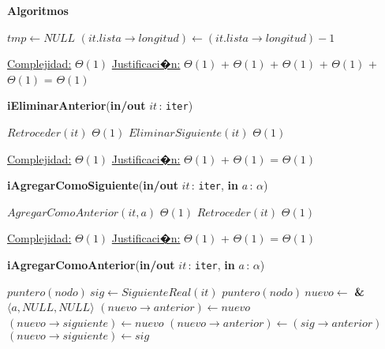 \documentclass[a4paper,10pt]{article}
\let\TipoVariable=\texttt
\let\ModificadorArgumento=\textbf
\newcommand{\In}[2]{\ModificadorArgumento{in} \ensuremath{#1}\,: \TipoVariable{#2}\xspace}
\newcommand{\Inout}[2]{\ModificadorArgumento{in/out} \ensuremath{#1}\,: \TipoVariable{#2}\xspace}
\newenvironment{Algoritmos}{%
  \vspace*{2ex}%
  \noindent\textbf{\Large Algoritmos}%
  \vspace*{2ex}%
}{}
\begin{document}
\begin{Algoritmos}
\begin{algorithm}[H]
\begin{algorithmic}[1]
			\State $tmp \gets NULL$	 
			\State $(it.lista\rightarrow longitud) \gets (it.lista\rightarrow longitud) - 1$

			\medskip
			\Statex \underline{Complejidad:} $\Theta(1)$
			\Statex \underline{Justificaci�n:} $\Theta(1)$ + $\Theta(1)$ + $\Theta(1)$ + $\Theta(1)$ + $\Theta(1)$ =  $\Theta(1)$
    	\end{algorithmic}
\end{algorithm}

	
\begin{algorithm}[H]
	\begin{algorithmic}[1]
		\State \textbf{iEliminarAnterior}(\Inout{it}{iter})
		
			\State $Retroceder(it)$	\Comment $\Theta(1)$
			\State $EliminarSiguiente(it)$	\Comment $\Theta(1)$

			\medskip
			\Statex \underline{Complejidad:} $\Theta(1)$
			\Statex \underline{Justificaci�n:} $\Theta(1)$ + $\Theta(1)$ = $\Theta(1)$
    	\end{algorithmic}
\end{algorithm}


\begin{algorithm}[H]
	\begin{algorithmic}[1]
		\State \textbf{iAgregarComoSiguiente}(\Inout{it}{iter}, \In{a}{$\alpha$})
		
			\State $AgregarComoAnterior(it, a)$		\Comment $\Theta(1)$
			\State $Retroceder(it)$	\Comment $\Theta(1)$

			\medskip
			\Statex \underline{Complejidad:} $\Theta(1)$
			\Statex \underline{Justificaci�n:} $\Theta(1)$ + $\Theta(1)$ = $\Theta(1)$
    	\end{algorithmic}
\end{algorithm}
	

\begin{algorithm}[H]
	\begin{algorithmic}[1]
		\State \textbf{iAgregarComoAnterior}(\Inout{it}{iter}, \In{a}{$\alpha$})
		
			\State $puntero(nodo) \ sig \gets SiguienteReal(it)$
			\State $puntero(nodo) \ nuevo \gets $ \textbf{\&} $\langle a, NULL, NULL \rangle$ 
				\State $(nuevo\rightarrow anterior) \gets nuevo$
				\State $(nuevo\rightarrow siguiente) \gets nuevo$
			\Else
				\State $(nuevo\rightarrow anterior) \gets (sig\rightarrow anterior)$
				\State $(nuevo\rightarrow siguiente) \gets sig$
			\EndIf
			

\end{algorithmic}
\end{algorithm}
\end{Algoritmos}
\end{document}
